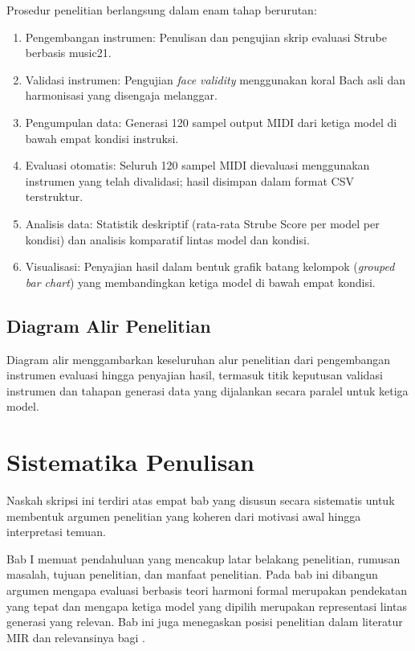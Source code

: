 Prosedur penelitian berlangsung dalam enam tahap berurutan:

\begin{enumerate}
    \item Pengembangan instrumen: Penulisan dan pengujian skrip evaluasi Strube berbasis music21.
    \item Validasi instrumen: Pengujian \textit{face validity} menggunakan koral Bach asli dan harmonisasi yang disengaja melanggar.
    \item Pengumpulan data: Generasi 120 sampel output MIDI dari ketiga model di bawah empat kondisi instruksi.
    \item Evaluasi otomatis: Seluruh 120 sampel MIDI dievaluasi menggunakan instrumen yang telah divalidasi; hasil disimpan dalam format CSV terstruktur.
    \item Analisis data: Statistik deskriptif (rata-rata Strube Score per model per kondisi) dan analisis komparatif lintas model dan kondisi.
    \item Visualisasi: Penyajian hasil dalam bentuk grafik batang kelompok (\textit{grouped bar chart}) yang membandingkan ketiga model di bawah empat kondisi.
\end{enumerate}

\subsection{Diagram Alir Penelitian}

Diagram alir menggambarkan keseluruhan alur penelitian dari pengembangan instrumen evaluasi hingga penyajian hasil, termasuk titik keputusan validasi instrumen dan tahapan generasi data yang dijalankan secara paralel untuk ketiga model.

\section{Sistematika Penulisan}

Naskah skripsi ini terdiri atas empat bab yang disusun secara sistematis untuk membentuk argumen penelitian yang koheren dari motivasi awal hingga interpretasi temuan.

Bab I memuat pendahuluan yang mencakup latar belakang penelitian, rumusan masalah, tujuan penelitian, dan manfaat penelitian. Pada bab ini dibangun argumen mengapa evaluasi berbasis teori harmoni formal merupakan pendekatan yang tepat dan mengapa ketiga model yang dipilih merupakan representasi lintas generasi yang relevan. Bab ini juga menegaskan posisi penelitian dalam literatur MIR dan relevansinya bagi \programstudy{} \institutionname{}.


